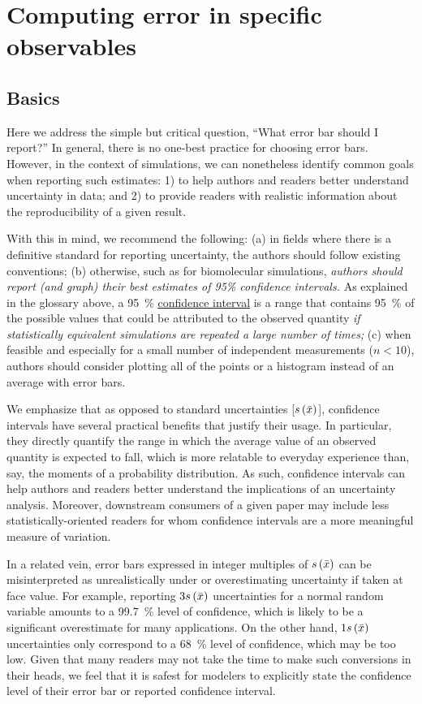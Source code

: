 \section{Computing error in specific observables}
\label{sec:specific}

\subsection{Basics}

Here we address the simple but critical question, ``What error bar should I report?''
In general, there is no one-best practice for choosing error bars. However, in the context of simulations, we can nonetheless identify common goals when reporting such estimates: 1) to help authors and readers better understand uncertainty in data; and 2) to provide readers with realistic information about the reproducibility of a given result.

With this in mind, we recommend the following: (a) in fields where there is a definitive standard for reporting uncertainty, the authors should follow existing conventions; (b) otherwise, such as for biomolecular simulations, \emph{authors should report (and graph) their best estimates of 95\% confidence intervals.} As explained in the glossary above, a 95~\% \hyperref[def:conf_int]{confidence interval} is a range that contains 95~\% of the possible values that could be attributed to the observed quantity \emph{if statistically equivalent simulations are repeated a large number of times;} (c) when feasible and especially for a small number of independent measurements ($n < 10$), authors should consider plotting all of the points or a histogram instead of an average with error bars.

We emphasize that as opposed to standard uncertainties [$s\left( \bar{x} \right)$], confidence intervals have several practical benefits that justify their usage. In particular, they directly quantify the range in which the average value of an observed quantity is expected to fall, which is more relatable to everyday experience than, say, the moments of a probability distribution. As such, confidence intervals can help authors and readers better understand the implications of an uncertainty analysis. Moreover, downstream consumers of a given paper may include less statistically-oriented readers for whom confidence intervals are a more meaningful measure of variation.

In a related vein, error bars expressed in integer multiples of $s\left( \bar{x} \right)$ can be misinterpreted as unrealistically under or overestimating uncertainty if taken at face value. For example, reporting $3s\left( \bar{x} \right)$ uncertainties for a normal random variable amounts to a 99.7~\% level of confidence, which is likely to be a significant overestimate for many applications. On the other hand, $1s\left( \bar{x} \right)$ uncertainties only correspond to a 68~\% level of confidence, which may be too low. Given that many readers may not take the time to make such conversions in their heads, we feel that it is safest for modelers to explicitly state the confidence level of their error bar or reported confidence interval.

